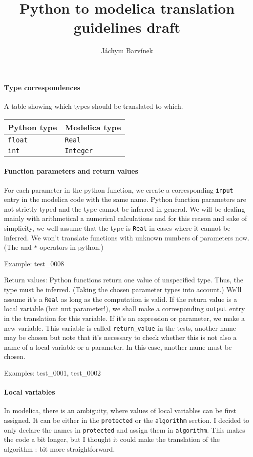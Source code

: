 \documentclass[a4paper,10pt]{article}
\title{Python to modelica translation guidelines draft}
\author{Jáchym Barvínek}
\date{}
\begin{document}
\maketitle

\paragraph{Type correspondences}
A table showing which types should be translated to which.
\begin{center}
\begin{tabular}{|l|l|}
\hline
Python type & Modelica type \\
\hline
\tt float & \tt Real \\
\tt int & \tt Integer \\
\hline
\end{tabular}
\end{center}


\paragraph{Function parameters and return values}
For each parameter in the python function, we create a corresponding {\tt input} entry in the modelica code with the same name.
Python function parameters are not strictly typed and the type cannot be inferred in general. 
We will be dealing mainly with arithmetical a numerical calculations and for this reason and sake of simplicity, we well assume
that the type is {\tt Real} in cases where it cannot be inferred.
We won't translate functions with unknown numbers of parameters now. (The {\tt *} and {\tt **} operators in python.)

Example: test\_0008

Return values: Python functions return one value of unspecified type. Thus, the type must be inferred.
(Taking the chosen parameter types into account.) We'll assume it's a {\tt Real} as long as the computation is valid.
If the return value is a local variable (but nut parameter!), we shall make a corresponding {\tt output}
entry in the translation for this variable. If it's an expression or parameter, we make a new variable.
This variable is called {\tt return\_value} in the tests, another name may be chosen but note that it's necessary to
check whether this is not also a name of a local variable or a parameter. In this case, another name must be chosen.

Examples: test\_0001, test\_0002

\paragraph{Local variables}
In modelica, there is an ambiguity, where values of local variables can be first assigned. It can be either in the
{\tt protected} or the {\tt algorithm} section. I decided to only declare the names in {\tt protected} and
assign them in {\tt algorithm}. This makes the code a bit longer, but I thought it could make the translation of the
algorithm : bit more straightforward.
\end{document}
